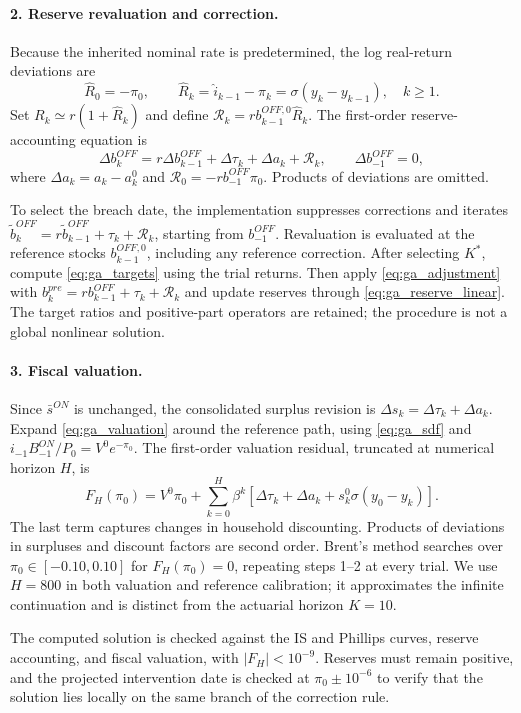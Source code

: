 \documentclass[12pt]{article}%
\theoremstyle{remark}
\begin{document}
\paragraph{2. Reserve revaluation and correction.}
Because the inherited nominal rate is predetermined, the log real-return deviations are
\begin{equation}
 \widehat R_0=-\pi_0,\qquad
 \widehat R_k=\widehat i_{k-1}-\pi_k
 =\sigma(y_k-y_{k-1}),\quad k\geq1.
 \label{eq:ga_real_returns}
\end{equation}
Set $R_k\simeq r(1+\widehat R_k)$ and define $\mathcal R_k=r b_{k-1}^{OFF,0}\widehat R_k$. The first-order reserve-accounting equation is
\begin{equation}
 \Delta b_k^{OFF}=r\Delta b_{k-1}^{OFF}
 +\Delta\tau_k+\Delta a_k+\mathcal R_k,
 \qquad \Delta b_{-1}^{OFF}=0,
 \label{eq:ga_reserve_linear}
\end{equation}
where $\Delta a_k=a_k-a_k^0$ and $\mathcal R_0=-r b_{-1}^{OFF}\pi_0$. Products of deviations are omitted.

To select the breach date, the implementation suppresses corrections and iterates $\widetilde b_k^{OFF}=r\widetilde b_{k-1}^{OFF}+\tau_k+\mathcal R_k$, starting from $b_{-1}^{OFF}$. Revaluation is evaluated at the reference stocks $b_{k-1}^{OFF,0}$, including any reference correction. After selecting $K^*$, compute \eqref{eq:ga_targets} using the trial returns. Then apply \eqref{eq:ga_adjustment} with $b_k^{pre}=r b_{k-1}^{OFF}+\tau_k+\mathcal R_k$ and update reserves through \eqref{eq:ga_reserve_linear}. The target ratios and positive-part operators are retained; the procedure is not a global nonlinear solution.

\paragraph{3. Fiscal valuation.}
Since $\bar s^{ON}$ is unchanged, the consolidated surplus revision is $\Delta s_k=\Delta\tau_k+\Delta a_k$. Expand \eqref{eq:ga_valuation} around the reference path, using \eqref{eq:ga_sdf} and $i_{-1}B_{-1}^{ON}/P_0=V^0e^{-\pi_0}$. The first-order valuation residual, truncated at numerical horizon $H$, is
\begin{equation}
 F_H(\pi_0)=V^0\pi_0+
 \sum_{k=0}^{H}\beta^k
 \left[\Delta\tau_k+\Delta a_k+s_k^0\sigma(y_0-y_k)\right].
 \label{eq:ga_numerical_root}
\end{equation}
The last term captures changes in household discounting. Products of deviations in surpluses and discount factors are second order. Brent's method searches over $\pi_0\in[-0.10,0.10]$ for $F_H(\pi_0)=0$, repeating steps 1--2 at every trial. We use $H=800$ in both valuation and reference calibration; it approximates the infinite continuation and is distinct from the actuarial horizon $K=10$.

The computed solution is checked against the IS and Phillips curves, reserve accounting, and fiscal valuation, with $|F_H|<10^{-9}$. Reserves must remain positive, and the projected intervention date is checked at $\pi_0\pm10^{-6}$ to verify that the solution lies locally on the same branch of the correction rule.
\end{document}
